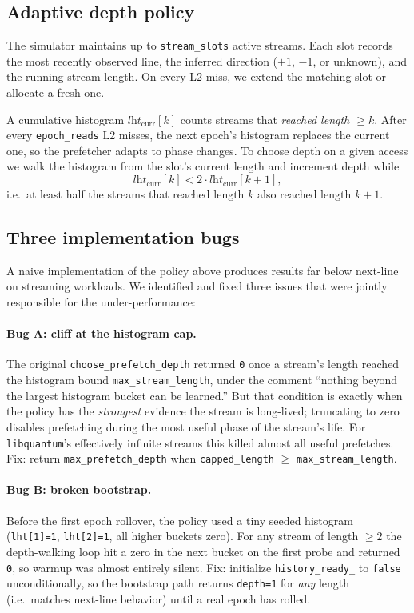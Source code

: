 \documentclass[11pt,letterpaper]{article}
\begin{document}
\subsection{Adaptive depth policy}
The simulator maintains up to \texttt{stream\_slots} active streams. Each
slot records the most recently observed line, the inferred direction
($+1$, $-1$, or unknown), and the running stream length. On every L2 miss,
we extend the matching slot or allocate a fresh one.

A cumulative histogram $\textit{lht}_\text{curr}[k]$ counts streams that
\emph{reached length $\geq k$}. After every \texttt{epoch\_reads} L2 misses,
the next epoch's histogram replaces the current one, so the prefetcher
adapts to phase changes. To choose depth on a given access we walk the
histogram from the slot's current length and increment depth while
$$\textit{lht}_\text{curr}[k]<2\cdot\textit{lht}_\text{curr}[k+1],$$
i.e.\ at least half the streams that reached length $k$ also reached
length $k+1$.

\subsection{Three implementation bugs}
\label{sec:bugs}
A naive implementation of the policy above produces results far below
next-line on streaming workloads. We identified and fixed three issues
that were jointly responsible for the under-performance:

\paragraph{Bug A: cliff at the histogram cap.}
The original \texttt{choose\_prefetch\_depth} returned \texttt{0} once a
stream's length reached the histogram bound \texttt{max\_stream\_length},
under the comment ``nothing beyond the largest histogram bucket can be
learned.'' But that condition is exactly when the policy has the
\emph{strongest} evidence the stream is long-lived; truncating to zero
disables prefetching during the most useful phase of the stream's life.
For \texttt{libquantum}'s effectively infinite streams this killed almost
all useful prefetches. Fix: return \texttt{max\_prefetch\_depth} when
\texttt{capped\_length} $\geq$ \texttt{max\_stream\_length}.

\paragraph{Bug B: broken bootstrap.}
Before the first epoch rollover, the policy used a tiny seeded histogram
(\texttt{lht[1]=1}, \texttt{lht[2]=1}, all higher buckets zero). For any
stream of length $\geq 2$ the depth-walking loop hit a zero in the next
bucket on the first probe and returned \texttt{0}, so warmup was almost
entirely silent. Fix: initialize \texttt{history\_ready\_} to \texttt{false}
unconditionally, so the bootstrap path returns \texttt{depth=1} for
\emph{any} length (i.e.\ matches next-line behavior) until a real epoch has
rolled.
\end{document}
